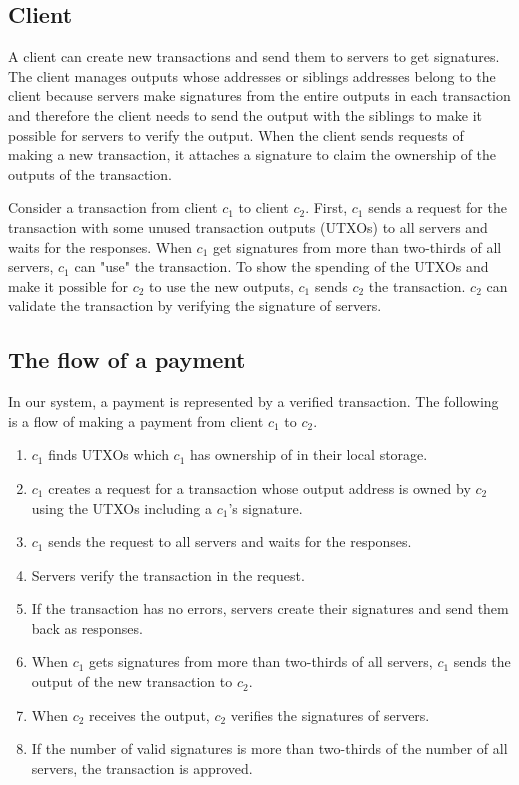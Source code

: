 \documentclass[a4paper, oneside]{discothesis}
\begin{document}
\subsection{Client}
A client can create new transactions and send them to servers to get signatures.
The client manages outputs whose addresses or siblings addresses belong to the client
because servers make signatures from the entire outputs in each transaction
and therefore the client needs to send the output with the siblings to make it possible
for servers to verify the output.
When the client sends requests of making a new transaction, it attaches a signature
to claim the ownership of the outputs of the transaction.

Consider a transaction from client $c_1$ to client $c_2$.
First, $c_1$ sends a request for the transaction with some unused transaction outputs (UTXOs)
to all servers and waits for the responses.
When $c_1$ get signatures from more than two-thirds of all servers,
$c_1$ can "use" the transaction.
To show the spending of the UTXOs and make it possible for $c_2$ to use the new outputs,
$c_1$ sends $c_2$ the transaction.
$c_2$ can validate the transaction by verifying the signature of servers.


\subsection{The flow of a payment}
In our system, a payment is represented by a verified transaction.
The following is a flow of making a payment from client $c_1$ to $c_2$.

\begin{enumerate}
    \item $c_1$ finds UTXOs which $c_1$ has ownership of in their local storage.
    \item $c_1$ creates a request for a transaction whose output address is owned by $c_2$
        using the UTXOs including a $c_1$'s signature.
    \item $c_1$ sends the request to all servers and waits for the responses.
    \item Servers verify the transaction in the request.
    \item If the transaction has no errors, servers create their signatures and send them back
        as responses.
    \item When $c_1$ gets signatures from more than two-thirds of all servers,
        $c_1$ sends the output of the new transaction to $c_2$.
    \item When $c_2$ receives the output, $c_2$ verifies the signatures of servers.
    \item If the number of valid signatures is more than two-thirds of the number of all servers,
        the transaction is approved.
\end{enumerate}
\end{document}
